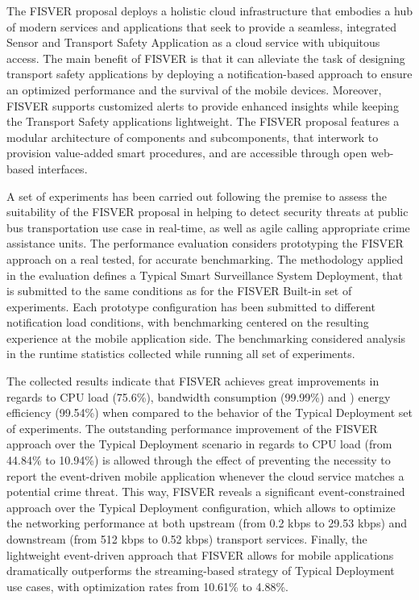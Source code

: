 The FISVER proposal deploys a holistic cloud infrastructure that embodies a hub of modern services and applications that seek to provide a seamless, integrated Sensor and Transport Safety Application as a cloud service with ubiquitous access. The main benefit of FISVER is that it can alleviate the task of designing transport safety applications by deploying a notification-based approach to ensure an optimized performance and the survival of the mobile devices. Moreover, FISVER supports customized alerts to provide enhanced insights while keeping the Transport Safety applications lightweight. The FISVER  proposal features a modular architecture of components and subcomponents, that interwork to provision value-added smart procedures, and are accessible through open web-based interfaces. 

A set of experiments has been carried out following the premise to assess the suitability of the FISVER proposal in helping to detect security threats at public bus transportation use case in real-time, as well as agile calling appropriate crime assistance units. The performance evaluation considers prototyping the FISVER approach on a real tested, for accurate benchmarking. The methodology applied in the evaluation defines a Typical Smart Surveillance System Deployment, that is submitted to the same conditions as for the FISVER Built-in set of experiments. Each prototype configuration has been submitted to different notification load conditions, with benchmarking centered on the resulting experience at the mobile application side.  The benchmarking considered analysis in the runtime statistics collected while running  all set of experiments. 

The collected results indicate that FISVER achieves great improvements in regards to CPU load (75.6\%), bandwidth consumption (99.99\%) and ) energy efficiency (99.54\%) when compared to the behavior of the Typical Deployment set of experiments. The outstanding performance improvement of the FISVER approach over the Typical Deployment scenario in regards to CPU load (from 44.84\% to 10.94\%) is allowed through the effect of preventing the necessity to report the event-driven mobile application whenever the cloud service matches a potential crime threat. This way, FISVER reveals a significant event-constrained approach over the Typical Deployment configuration, which allows to optimize the networking performance at both upstream (from 0.2 kbps to 29.53 kbps) and downstream (from 512 kbps to 0.52 kbps) transport services. Finally, the lightweight event-driven approach that FISVER allows for mobile applications dramatically outperforms the streaming-based strategy of Typical Deployment use cases, with optimization rates from  10.61\% to 4.88\%. 

